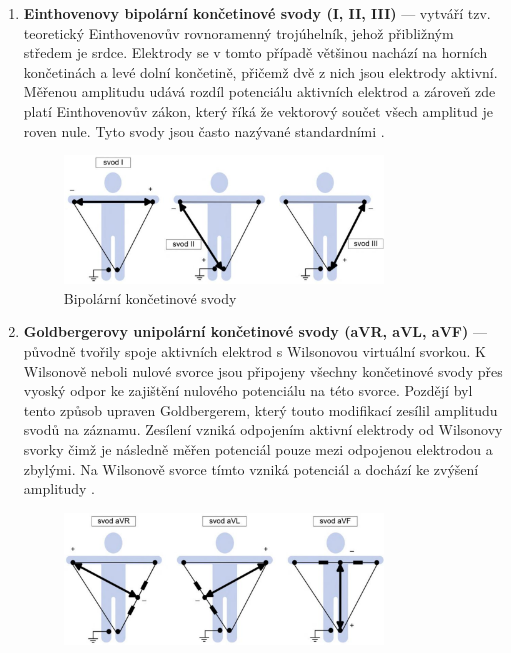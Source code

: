 \begin{enumerate}
	\item \textbf{Einthovenovy bipolární končetinové svody (I, II, III)} ---
	      vytváří tzv. teoretický Einthovenovův rovnoramenný trojúhelník, jehož
	      přibližným středem je srdce. Elektrody se v tomto případě většinou
	      nachází na horních končetinách a levé dolní končetině, přičemž dvě z
	      nich jsou elektrody aktivní. Měřenou amplitudu udává rozdíl
	      potenciálu aktivních elektrod a zároveň zde platí Einthovenovův
	      zákon, který říká že vektorový součet všech amplitud je roven nule.
	      Tyto svody jsou často nazývané standardními \cite{Kittnar2020}.
	      \begin{figure}[h]
		      \begin{center}
			      \includegraphics[width=0.8\textwidth]{../assets/anatomy/bipolar}
			      \caption{Bipolární končetinové svody \cite{Kittnar2020}}
			      \label{img:bipolar}
		      \end{center}
	      \end{figure}
	\item \textbf{Goldbergerovy unipolární končetinové svody (aVR, aVL, aVF)}
	      --- původně tvořily spoje aktivních elektrod s Wilsonovou virtuální
	      svorkou. K Wilsonově neboli nulové svorce jsou připojeny všechny
	      končetinové svody přes vyoský odpor ke zajištění nulového potenciálu
	      na této svorce. Pozdějí byl tento způsob upraven Goldbergerem, který
	      touto modifikací zesílil amplitudu svodů na záznamu. Zesílení vzniká
	      odpojením aktivní elektrody od Wilsonovy svorky čimž je následně měřen
	      potenciál pouze mezi odpojenou elektrodou a zbylými. Na Wilsonově
	      svorce tímto vzniká potenciál a dochází ke zvýšení amplitudy
	      \cite{Kittnar2020}.
	      \begin{figure}[h]
		      \begin{center}
			      \includegraphics[width=0.8\textwidth]{../assets/anatomy/unipolar1}

\end{center}
\end{figure}
\end{enumerate}
